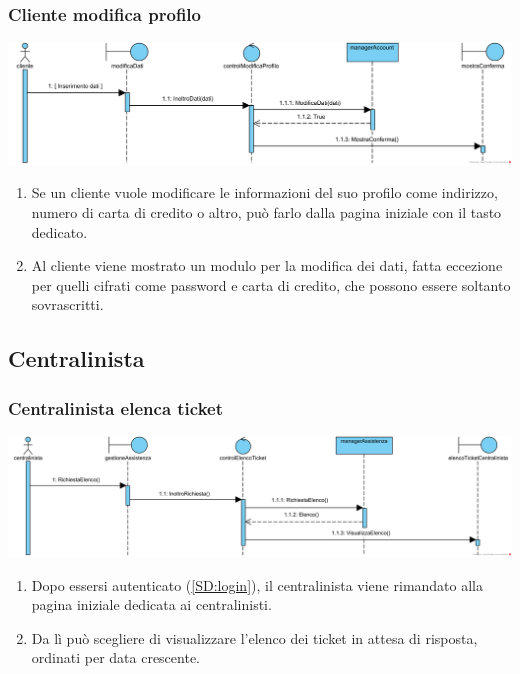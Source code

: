 \documentclass[12pt]{article}
\begin{document}
\subsubsection{Cliente modifica profilo}
\label{SD:modificaprofilo}
\begin{center}
\includegraphics[width=\textwidth]{SequenceDiagram/ClienteProfiloModifica}
\end{center}

\begin{enumerate}
\item Se un cliente vuole modificare le informazioni del suo profilo come indirizzo, numero di carta di credito o altro, può farlo dalla pagina iniziale con il tasto dedicato.
\item Al cliente viene mostrato un modulo per la modifica dei dati, fatta eccezione per quelli cifrati come password e carta di credito, che possono essere soltanto sovrascritti.
\end{enumerate}

\newpage

\subsection{Centralinista}
\subsubsection{Centralinista elenca ticket}
\label{SD:centralinistaelencaticket}

\begin{center}
\includegraphics[width=\textwidth]{SequenceDiagram/CentralinistaTicketElenco}
\end{center}

\begin{enumerate}
\item Dopo essersi autenticato (\ref{SD:login}), il centralinista viene rimandato alla pagina iniziale dedicata ai centralinisti. 
\item Da lì può scegliere di visualizzare l'elenco dei ticket in attesa di risposta, ordinati per data crescente.
\end{enumerate}
\end{document}

